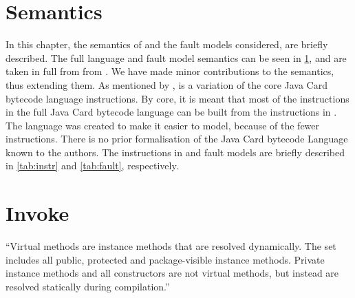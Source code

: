 \section{Semantics}\label{chap:semantics}
%
%
%
In this chapter, the semantics of \jcl and the fault models considered, are briefly described. The full language and fault model semantics can be seen in \cref{chap:semantics}, and are taken in full from from \cite{javasec}. We have made minor contributions to the semantics, thus extending them. As mentioned by \cite{javasec}, \jcl is a variation of the core Java Card bytecode language instructions. By core, it is meant that most of the instructions in the full  Java Card bytecode language can be built from the instructions in \jcl. The language was created to make it easier to model, because of the fewer instructions. There is no prior formalisation of the Java Card bytecode Language known to the authors. The instructions in \jcl and fault models are briefly described in \cref{tab:instr} and \cref{tab:fault}, respectively. 



\section{Invoke}
``Virtual methods are instance methods that are resolved dynamically. The set includes all public, protected and package-visible instance methods. Private instance methods and all constructors are not virtual methods, but instead are resolved statically during compilation.'' \cite[chap. 4.3.7.6]{java_card_spec}
